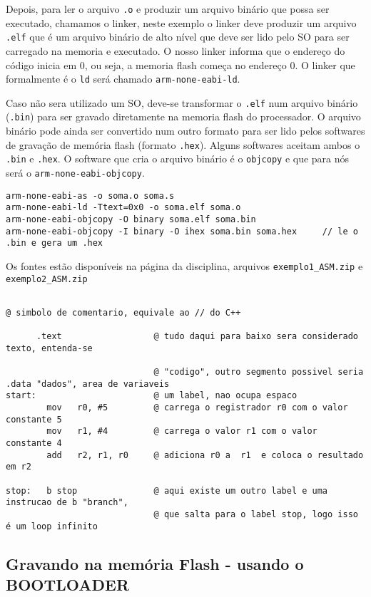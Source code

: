 \documentclass[a4paper,10pt]{article}
\begin{document}
Depois, para ler o arquivo \verb|.o| e produzir um arquivo binário que possa ser executado, chamamos o linker, neste exemplo o linker deve produzir um arquivo \verb|.elf| que é um arquivo binário de alto nível que deve ser lido pelo SO para ser carregado na memoria e executado.  O nosso linker informa que o endereço do código inicia em 0, ou seja, a memoria flash começa no endereço 0. O linker que formalmente é o \verb|ld| será chamado \verb|arm-none-eabi-ld|.


Caso não sera utilizado um SO, deve-se transformar o \verb|.elf| num arquivo binário (\verb|.bin|) para ser gravado diretamente na memoria flash do processador. O arquivo binário pode ainda ser convertido num outro formato para ser lido pelos softwares de gravação de memória flash (formato \verb|.hex|). Alguns softwares aceitam ambos o \verb|.bin| e \verb|.hex|.  O software que cria o arquivo binário é o \verb|objcopy| e que para nós será o \verb|arm-none-eabi-objcopy|.

\begin{lstlisting}
arm-none-eabi-as -o soma.o soma.s
arm-none-eabi-ld -Ttext=0x0 -o soma.elf soma.o
arm-none-eabi-objcopy -O binary soma.elf soma.bin
arm-none-eabi-objcopy -I binary -O ihex soma.bin soma.hex     // le o .bin e gera um .hex 
\end{lstlisting}

Os fontes estão disponíveis na página da disciplina, arquivos \texttt{exemplo1\_ASM.zip} e \texttt{exemplo2\_ASM.zip}
\begin{lstlisting}[language={}]

@ simbolo de comentario, equivale ao // do C++

      .text                  @ tudo daqui para baixo sera considerado texto, entenda-se

                             @ "codigo", outro segmento possivel seria .data "dados", area de variaveis
start:                       @ um label, nao ocupa espaco
        mov   r0, #5         @ carrega o registrador r0 com o valor constante 5
        mov   r1, #4         @ carrega o valor r1 com o valor constante 4
        add   r2, r1, r0     @ adiciona r0 a  r1  e coloca o resultado em r2

stop:   b stop               @ aqui existe um outro label e uma instrucao de b "branch", 
                             @ que salta para o label stop, logo isso é um loop infinito
\end{lstlisting}


\subsection{Gravando na memória Flash - usando o BOOTLOADER}
\end{document}
